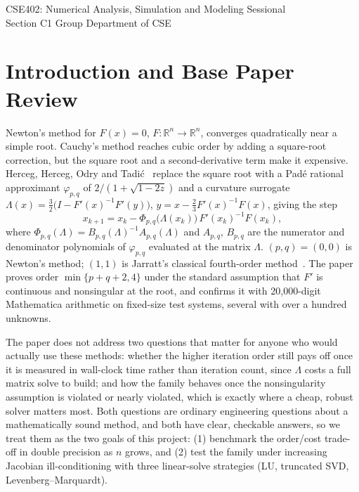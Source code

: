 \documentclass[sigconf,nonacm]{acmart}
\begin{document}
\maketitle
\begin{center}\small
CSE402: Numerical Analysis, Simulation and Modeling Sessional \\
Section C1 \quad Group \groupno{} \quad Department of CSE
\end{center}

\section{Introduction and Base Paper Review}

Newton's method for $F(x)=0$, $F:\mathbb{R}^n\to\mathbb{R}^n$, converges quadratically near a
simple root. Cauchy's method reaches cubic order by adding a square-root correction, but the
square root and a second-derivative term make it expensive. Herceg, Herceg, Odry and
Tadi\'c~\cite{herceg2025pade} replace the square root with a Pad\'e rational approximant
$\varphi_{p,q}$ of $2/(1+\sqrt{1-2z})$ and a curvature surrogate
$\Lambda(x)=\tfrac32\big(I-F'(x)^{-1}F'(y)\big)$, $y=x-\tfrac23F'(x)^{-1}F(x)$, giving the step
\[
x_{k+1}=x_k-\Phi_{p,q}\big(\Lambda(x_k)\big)\,F'(x_k)^{-1}F(x_k),
\]
where $\Phi_{p,q}(\Lambda)=B_{p,q}(\Lambda)^{-1}A_{p,q}(\Lambda)$ and $A_{p,q}$, $B_{p,q}$ are
the numerator and denominator polynomials of $\varphi_{p,q}$ evaluated at the matrix
$\Lambda$. $(p,q)=(0,0)$ is Newton's method; $(1,1)$ is Jarratt's classical fourth-order
method~\cite{jarratt1966}. The paper proves order $\min\{p+q+2,4\}$ under the standard
assumption that $F'$ is continuous and nonsingular at the root, and confirms it with
20{,}000-digit Mathematica arithmetic on fixed-size test systems, several with over a hundred
unknowns.

The paper does not address two questions that matter for anyone who would actually use these
methods: whether the higher iteration order still pays off once it is measured in wall-clock
time rather than iteration count, since $\Lambda$ costs a full matrix solve to build; and how
the family behaves once the nonsingularity assumption is violated or nearly violated, which is
exactly where a cheap, robust solver matters most. Both questions are ordinary engineering
questions about a mathematically sound method, and both have clear, checkable answers, so we
treat them as the two goals of this project: (1) benchmark the order/cost trade-off in double
precision as $n$ grows, and (2) test the family under increasing Jacobian ill-conditioning with
three linear-solve strategies (LU, truncated SVD, Levenberg--Marquardt).
\end{document}
